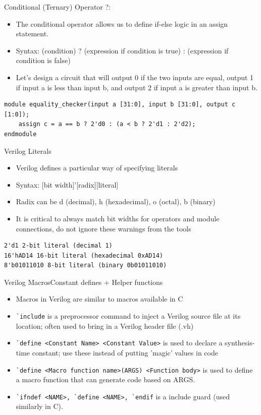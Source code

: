 \documentclass{beamer}
\begin{document}
\begin{frame}[fragile]{Conditional (Ternary) Operator ?:}
	\begin{itemize}
		\item The conditional operator allows us to define if-else logic in an assign statement.
		\item Syntax: (condition) ? (expression if condition is true) : (expression if condition is false)
		\item Let's design a circuit that will output 0 if the two inputs are equal, output 1 if input a is less than input b, and output 2 if input a is greater than input b.
	\end{itemize}

\begin{verbatim}
module equality_checker(input a [31:0], input b [31:0], output c [1:0]);
	assign c = a == b ? 2'd0 : (a < b ? 2'd1 : 2'd2);
endmodule
\end{verbatim}
\end{frame}

\begin{frame}[fragile]{Verilog Literals}
	\begin{itemize}
		\item Verilog defines a particular way of specifying literals
		\item Syntax: [bit width]'[radix][literal]
		\item Radix can be d (decimal), h (hexadecimal), o (octal), b (binary)
		\item It is critical to always match bit widths for operators and module connections, do not ignore these warnings from the tools
	\end{itemize}
\begin{verbatim}
2'd1 2-bit literal (decimal 1)
16'hAD14 16-bit literal (hexadecimal 0xAD14)
8'b01011010 8-bit literal (binary 0b01011010)
\end{verbatim}
\end{frame}

\begin{frame}{Verilog Macros}{Constant defines + Helper functions}
	\begin{itemize}
		\item Macros in Verilog are similar to macros available in C
		\item \texttt{\`{}include} is a preprocessor command to inject a Verilog source file at its location; often used to bring in a Verilog header file (.vh)
		\item \texttt{\`{}define <Constant Name> <Constant Value>} is used to declare a synthesis-time constant; use these instead of putting 'magic' values in code
		\item \texttt{\`{}define <Macro function name>(ARGS) <Function body>} is used to define a macro function that can generate code based on ARGS.
		\item \texttt{\`{}ifndef <NAME>, \`{}define <NAME>, \`{}endif} is a include guard (used similarly in C).
	\end{itemize}
\end{frame}
\end{document}
